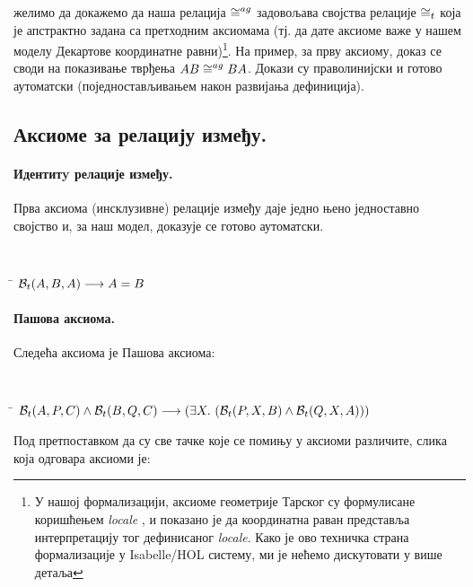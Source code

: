 желимо да докажемо да наша релација $ \cong^{ag} $ задовољава
својства релације $ \cong_t $ која је апстрактно задана са
претходним аксиомама (тј. да дате аксиоме важе у нашем моделу
Декартове координатне равни)\footnote{У нашој формализацији, аксиоме
  геометрије Тарског су формулисане коришћењем \emph{locale}
  \cite{locales}, и показано је да координатна раван представља
  интерпретацију тог дефинисаног \emph{locale}. Како је ово техничка
  страна формализације у Isabelle/HOL систему, ми је нећемо
  дискутовати у више детаља}.  На пример, за прву аксиому, доказ се
своди на показивање тврђења \mbox{$AB \cong^{ag} BA$}. Докази су
праволинијски и готово аутоматски (поједностављивањем након развијања
дефиниција).

\subsection{Аксиоме за релацију између.}


\paragraph{Идентитy релације између.}

Прва аксиома (инсклузивне) релације између даје једно њено једноставно
својство и, за наш модел, доказује се готово аутоматски.

{\tt
\begin{tabbing}
\hspace{5mm}\=\kill
$\mathcal{B}_t(A, B, A) \longrightarrow A = B$
\end{tabbing}
}

\paragraph{Пашова аксиома.}

Следећа аксиома је Пашова аксиома:
{\tt
\begin{tabbing}
\hspace{5mm}\=\kill
$\mathcal{B}_t(A, P, C) \wedge \mathcal{B}_t(B, Q, C) \longrightarrow (\exists X.\ (\mathcal{B}_t(P, X, B) \wedge \mathcal{B}_t(Q, X, A)))$
\end{tabbing}
}

Под претпоставком да су све тачке које се помињу у аксиоми различите,
слика која одговара аксиоми је:
\begin{center}

\end{center}


